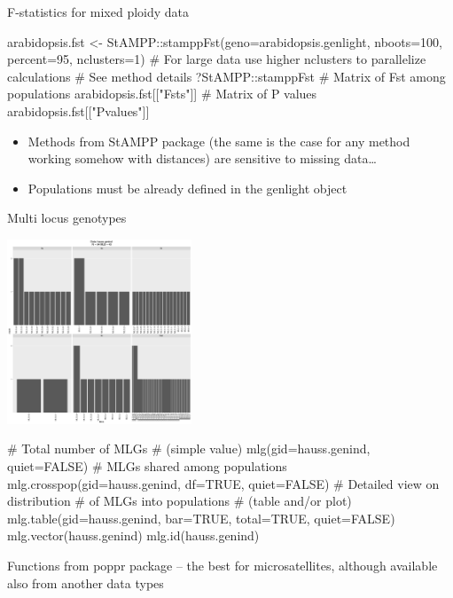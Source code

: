\documentclass[compress, ucs, xelatex, 11pt, xcolor=svgnames,
  hyperref={
    bookmarks=true,
    unicode=true,
    colorlinks=true,
    pdftitle={Molecular data in R},
    plainpages=false,
    pdfauthor={Vojtech Zeisek},
    pdfsubject={Course about phylogeny and evolution in R},
    pdfcreator={XeLaTeX},
    pdfkeywords={R, evolution, phylogeny, molecular data},
    linkcolor=Tomato,
    anchorcolor=SaddleBrown,
    citecolor=Goldenrod,
    filecolor=DarkMagenta,
    menucolor=Sienna,
    urlcolor=DarkTurquoise,
    pdftex},
  url={hyphens, lowtilde} %
  ]{beamer}
\begin{document}
\begin{frame}[fragile]{F-statistics for mixed ploidy data}
  \begin{spluscode}
    arabidopsis.fst <- StAMPP::stamppFst(geno=arabidopsis.genlight,
      nboots=100, percent=95, nclusters=1)
    # For large data use higher nclusters to parallelize calculations
    # See method details
    ?StAMPP::stamppFst
    # Matrix of Fst among populations
    arabidopsis.fst[["Fsts"]]
    # Matrix of P values
    arabidopsis.fst[["Pvalues"]]
  \end{spluscode}
  \begin{itemize}
    \item Methods from StAMPP package (the same is the case for any method working somehow with distances) are sensitive to missing data\ldots
    \item Populations must be already defined in the genlight object
  \end{itemize}
\end{frame}


\begin{frame}[fragile]{Multi locus genotypes}
  \begin{multicols}{2}
  \includegraphics[height=5.5cm]{mlg.png}
  \begin{spluscode}
    # Total number of MLGs
    # (simple value)
    mlg(gid=hauss.genind, quiet=FALSE)
    # MLGs shared among populations
    mlg.crosspop(gid=hauss.genind,
      df=TRUE, quiet=FALSE)
    # Detailed view on distribution
    # of MLGs into populations
    # (table and/or plot)
    mlg.table(gid=hauss.genind,
      bar=TRUE, total=TRUE,
      quiet=FALSE)
    mlg.vector(hauss.genind)
    mlg.id(hauss.genind)
  \end{spluscode}
  \end{multicols}
  Functions from poppr package -- the best for microsatellites, although available also from another data types
\end{frame}
\end{document}
